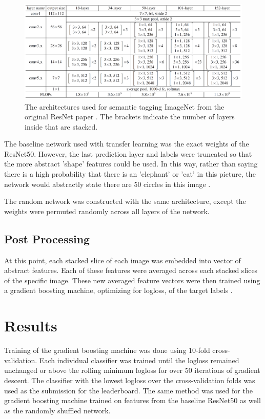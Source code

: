 \documentclass[conference,11pt]{IEEEtran}
\begin{document}
\begin{figure}
    \centering
    \includegraphics[width=0.8\linewidth]{figures/plot_resnet50.png}
    \caption{The architectures used for semantic tagging ImageNet from the original ResNet paper \cite{he_deep_2015}. The brackets indicate the number of layers inside that are stacked.}
    \label{fig:resnet50}
\end{figure}

The baseline network used with transfer learning was the exact weights of the ResNet50. However, the last prediction layer and labels were truncated so that the more abstract 'shape' features could be used. In this way, rather than saying there is a high probability that there is an 'elephant' or 'cat' in this picture, the network would abstractly state there are 50 circles in this image \cite{erhan_visualizing_2009}.

The random network was constructed with the same architecture, except the weights were permuted randomly across all layers of the network.

\subsection{Post Processing}
At this point, each stacked slice of each image was embedded into vector of abstract features. Each of these features were averaged across each stacked slices of the specific image. These new averaged feature vectors were then trained using a gradient boosting machine, optimizing for logloss, of the target labels \cite{friedman_greedy_2000}.

\section{Results}

Training of the gradient boosting machine was done using 10-fold cross-validation. Each individual classifier was trained until the logloss remained unchanged or above the rolling minimum logloss for over 50 iterations of gradient descent. The classifier with the lowest logloss over the cross-validation folds was used as the submission for the leaderboard. The same method was used for the gradient boosting machine trained on features from the baseline ResNet50 as well as the randomly shuffled network.
\end{document}
